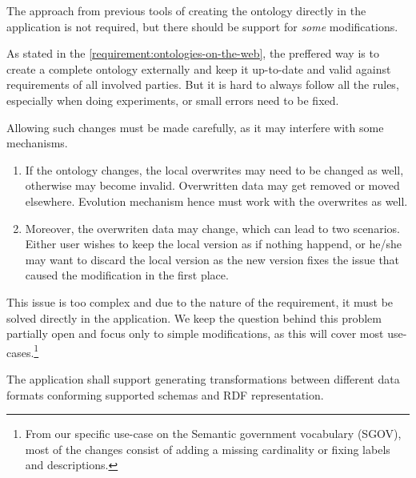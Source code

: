

\begin{requirement}
    \label{requirement:pim-editing}
    The approach from previous tools of creating the ontology directly in the application is not required, but there should be support for \textit{some} modifications.
\end{requirement}

As stated in the \autoref{requirement:ontologies-on-the-web}, the preffered way is to create a complete ontology externally and keep it up-to-date and valid against requirements of all involved parties. But it is hard to always follow all the rules, especially when doing experiments, or small errors need to be fixed.

Allowing such changes must be made carefully, as it may interfere with some mechanisms.
\begin{enumerate}
    \item If the ontology changes, the local overwrites may need to be changed as well, otherwise may become invalid. Overwritten data may get removed or moved elsewhere. Evolution mechanism hence must work with the overwrites as well.
    \item Moreover, the overwriten data may change, which can lead to two scenarios. Either user wishes to keep the local version as if nothing happend, or he/she may want to discard the local version as the new version fixes the issue that caused the modification in the first place.
\end{enumerate}

This issue is too complex and due to the nature of the requirement, it must be solved directly in the application. We keep the question behind this problem partially open and focus only to simple modifications, as this will cover most use-cases.\footnote{From our specific use-case on the Semantic government vocabulary (SGOV), most of the changes consist of adding a missing cardinality or fixing labels and descriptions.}


\begin{requirement}
    The application shall support generating transformations between different data formats conforming supported schemas and RDF representation.
\end{requirement}

